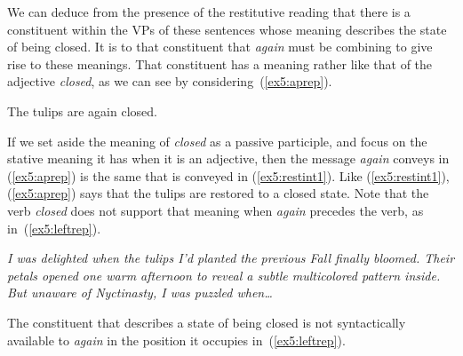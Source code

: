 We can deduce from the presence of the restitutive reading that there is a constituent within the VPs of these sentences whose meaning describes the state of being closed. It is to that constituent that \emph{again} must be combining to give rise to these meanings. That constituent has a meaning rather like that of the adjective \emph{closed}, as we can see by considering~(\ref{ex5:aprep}).
\begin{exe}
	\raggedright
	\ex \label{ex5:aprep} 
	The tulips are again closed.
\end{exe}
If we set aside the meaning of \emph{closed} as a passive participle, and focus on the stative meaning it has when it is an adjective, then the message \emph{again} conveys in (\ref{ex5:aprep}) is the same that is conveyed in (\ref{ex5:restint1}).%
%
 Like (\ref{ex5:restint1}), (\ref{ex5:aprep}) says that the tulips are restored to a closed state. Note that the verb \emph{closed} does not support that meaning when \emph{again} precedes the verb, as in~(\ref{ex5:leftrep}).%
%
\begin{exe}
	\raggedright
		\sn \emph{I was delighted when the tulips I'd planted the previous Fall finally bloomed. Their petals opened one warm afternoon to reveal a subtle multicolored pattern inside. But unaware of Nyctinasty, I was puzzled when\ldots}
\end{exe}
The constituent that describes a state of being closed is not syntactically available to \emph{again} in the position it occupies in~(\ref{ex5:leftrep}). 

